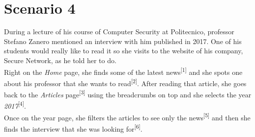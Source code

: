 \documentclass[12pt]{report}
\begin{document}
\section{Scenario 4}
During a lecture of his course of Computer Security at Politecnico, professor Stefano Zanero mentioned an interview with him published in 2017.
One of his students would really like to read it so she visits to the website of his company, Secure Network, as he told her to do.
\\
\noindent
Right on the \emph{Home} page, she finds some of the latest news\textsuperscript{[1]} and she spots one about his professor that she wants to read\textsuperscript{[2]}.
After reading that article, she goes back to the \emph{Articles} page\textsuperscript{[3]} using the breadcrumbs on top and she selects the year \emph{2017}\textsuperscript{[4]}.
\\
\noindent
Once on the year page, she filters the articles to see only the news\textsuperscript{[5]} and then she finds the interview that she was looking for\textsuperscript{[6]}.
\end{document}
